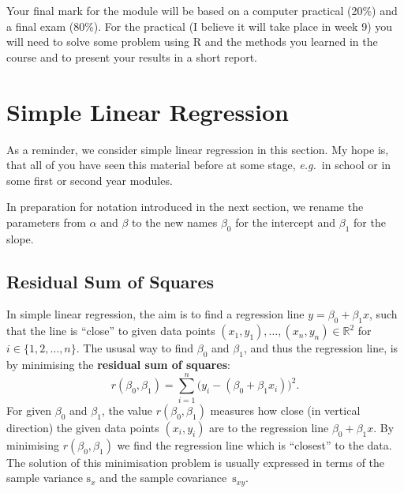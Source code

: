 \documentclass[
  a4paper,
]{article}
\theoremstyle{definition}
\theoremstyle{definition}
\theoremstyle{definition}
\theoremstyle{definition}
\theoremstyle{remark}
\begin{document}
Your final mark for the module will be based on a computer practical
(20\%) and a final exam (80\%). For the practical (I believe it will
take place in week 9) you will need to solve some problem using R and
the methods you learned in the course and to present your results in a
short report.

\clearpage

\hypertarget{S01-simple}{%
\section{Simple Linear Regression}\label{S01-simple}}

As a reminder, we consider simple linear regression in this section.
My hope is, that all of you have seen this material before at some
stage, \emph{e.g.}~in school or in some first or second year modules.

In preparation for notation introduced in the next section, we rename
the parameters from \(\alpha\) and \(\beta\) to the new names \(\beta_0\)
for the intercept and \(\beta_1\) for the slope.

\hypertarget{residual-sum-of-squares}{%
\subsection{Residual Sum of Squares}\label{residual-sum-of-squares}}

In simple linear regression, the aim is to find a regression line \(y = \beta_0 + \beta_1 x\), such that the line is ``close'' to given data points
\((x_1, y_1), \ldots, (x_n, y_n) \in\mathbb{R}^2\) for \(i \in \{1, 2, \ldots, n\}\). The ususal way to find \(\beta_0\) and \(\beta_1\), and thus the regression
line, is by minimising the \textbf{residual sum of squares}:
\begin{equation}
  r(\beta_0, \beta_1)
  = \sum_{i=1}^n \bigl( y_i - (\beta_0 + \beta_1 x_i) \bigr)^2.
  \label{eq:RSS}
\end{equation}
For given \(\beta_0\) and \(\beta_1\), the value \(r(\beta_0, \beta_1)\) measures
how close (in vertical direction) the given data points \((x_i, y_i)\)
are to the regression line \(\beta_0 + \beta_1 x\). By minimising
\(r(\beta_0, \beta_1)\) we find the regression line which is ``closest'' to
the data. The solution of this minimisation problem is usually
expressed in terms of the sample variance \(\mathrm{s}_x\) and the
sample covariance~\(\mathrm{s}_{xy}\).
\end{document}
